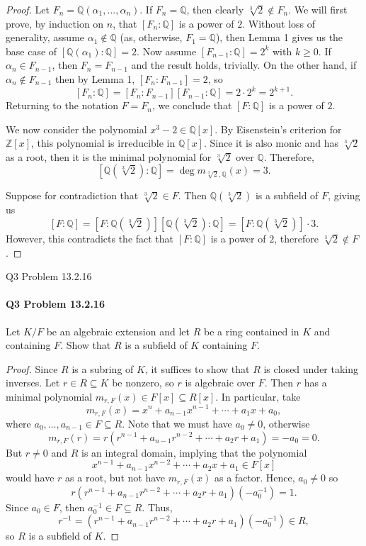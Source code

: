 \documentclass[12pt]{article}
\newenvironment{fullbox}{\begin{lrbox}{\savefullbox}\begin{minipage}{\dimexpr\textwidth-2\fboxsep\relax}}{\end{minipage}\end{lrbox}\begin{center}\framebox[\textwidth]{\usebox{\savefullbox}}\end{center}}
\newenvironment{pbox}[1][]{\begin{fullbox}\ifx#1\empty\else\paragraph{#1}\fi}{\end{fullbox}}
\theoremstyle{definition}
\newcommand{\Z}{\mathbb{Z}}
\newcommand{\Q}{\mathbb{Q}}
\begin{document}
\begin{proof}
    Let $F_n = \Q(\alpha_1, \dots, \alpha_n)$. If $F_n = \Q$, then clearly $\sqrt[3]{2} \notin F_n$. We will first prove, by induction on $n$, that $[F_n : \Q]$ is a power of $2$. Without loss of generality, assume $\alpha_1 \notin \Q$ (as, otherwise, $F_1 = \Q$), then Lemma 1 gives us the base case of $[\Q(\alpha_1) : \Q] = 2$. Now assume $[F_{n-1} : \Q] = 2^k$ with $k \geq 0$. If $\alpha_n \in F_{n-1}$, then $F_n = F_{n-1}$ and the result holds, trivially. On the other hand, if $\alpha_n \notin F_{n-1}$ then by Lemma 1, $[F_n : F_{n-1}] = 2$, so
    \[
        [F_n : \Q] = [F_n : F_{n-1}][F_{n-1} : \Q] = 2 \cdot 2^k = 2^{k+1}.
    \]
    Returning to the notation $F = F_n$, we conclude that $[F : \Q]$ is a power of $2$.

    We now consider the polynomial $x^3 - 2 \in \Q[x]$. By Eisenstein's criterion for $\Z[x]$, this polynomial is irreducible in $\Q[x]$. Since it is also monic and has $\sqrt[3]{2}$ as a root, then it is the minimal polynomial for $\sqrt[3]{2}$ over $\Q$. Therefore,
    \[
        [\Q(\sqrt[3]{2}) : \Q] = \deg m_{\sqrt[3]{2}, \Q}(x) = 3.
    \]

    Suppose for contradiction that $\sqrt[3]{2} \in F$. Then $\Q(\sqrt[3]{2})$ is a subfield of $F$, giving us
    \[
        [F : \Q] = [F : \Q(\sqrt[3]{2})][\Q(\sqrt[3]{2}) : \Q] = [F : \Q(\sqrt[3]{2})] \cdot 3.
    \]
    However, this contradicts the fact that $[F : \Q]$ is a power of $2$, therefore $\sqrt[3]{2} \notin F$.

\end{proof}



\newpage
\begin{pbox}[Q3 Problem 13.2.16]
    Let $K/F$ be an algebraic extension and let $R$ be a ring contained in $K$ and containing $F$. Show that $R$ is a subfield of $K$ containing $F$.
\end{pbox}

\begin{proof}
    Since $R$ is a subring of $K$, it suffices to show that $R$ is closed under taking inverses. Let $r \in R \subseteq K$ be nonzero, so $r$ is algebraic over $F$. Then $r$ has a minimal polynomial $m_{r, F}(x) \in F[x] \subseteq R[x]$. In particular, take
    \[
        m_{r, F}(x) = x^n + a_{n-1}x^{n-1} + \cdots + a_1x + a_0,
    \]
    where $a_0, \dots, a_{n-1} \in F \subseteq R$. Note that we must have $a_0 \ne 0$, otherwise
    \[
        m_{r, F}(r) = r(r^{n-1} + a_{n-1}r^{n-2} + \cdots + a_2r + a_1) = -a_0 = 0.
    \]
    But $r \ne 0$ and $R$ is an integral domain, implying that the polynomial
    \[
        x^{n-1} + a_{n-1}x^{n-2} + \cdots + a_2x + a_1 \in F[x]
    \]
    would have $r$ as a root, but not have $m_{r, F}(x)$ as a factor. Hence, $a_0 \ne 0$ so
    \[
        r(r^{n-1} + a_{n-1}r^{n-2} + \cdots + a_2r + a_1)(-a_0^{-1}) = 1.
    \]
    Since $a_0 \in F$, then $a_0^{-1} \in F \subseteq R$. Thus,
    \[
        r^{-1} = (r^{n-1} + a_{n-1}r^{n-2} + \cdots + a_2r + a_1)(-a_0^{-1}) \in R,
    \]
    so $R$ is a subfield of $K$.

\end{proof}
\end{document}
